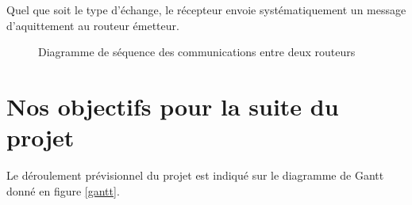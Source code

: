 \documentclass[a4paper,11pt]{article}
\begin{document}
Quel que soit le type d'échange, le récepteur envoie systématiquement un message d'aquittement au routeur émetteur.

\begin{figure}[H]
\begin{center}
\caption{Diagramme de séquence des communications entre deux routeurs}
\end{center}
\end{figure}

\section{Nos objectifs pour la suite du projet}

Le déroulement prévisionnel du projet est indiqué sur le diagramme de Gantt donné en figure \ref{gantt}.
\end{document}
